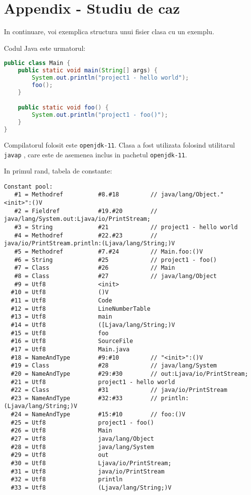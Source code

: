 \section{Appendix - Studiu de caz}\label{appendix:studiu_de_caz}

In continuare, voi exemplica structura unui fisier clasa cu un exemplu.

Codul Java este urmatorul:

\begin{lstlisting}[language=Java]
public class Main {
    public static void main(String[] args) {
        System.out.println("project1 - hello world");
        foo();
    }

    public static void foo() {
        System.out.println("project1 - foo()");
    }
}
\end{lstlisting}

Compilatorul folosit este \texttt{openjdk-11}. Clasa a fost utilizata
folosind utilitarul \texttt{javap} \cite{javap}, care este de asemenea inclus
in pachetul \texttt{openjdk-11}.

In primul rand, tabela de constante:

\begin{lstlisting}
Constant pool:
   #1 = Methodref          #8.#18         // java/lang/Object."<init>":()V
   #2 = Fieldref           #19.#20        // java/lang/System.out:Ljava/io/PrintStream;
   #3 = String             #21            // project1 - hello world
   #4 = Methodref          #22.#23        // java/io/PrintStream.println:(Ljava/lang/String;)V
   #5 = Methodref          #7.#24         // Main.foo:()V
   #6 = String             #25            // project1 - foo()
   #7 = Class              #26            // Main
   #8 = Class              #27            // java/lang/Object
   #9 = Utf8               <init>
  #10 = Utf8               ()V
  #11 = Utf8               Code
  #12 = Utf8               LineNumberTable
  #13 = Utf8               main
  #14 = Utf8               ([Ljava/lang/String;)V
  #15 = Utf8               foo
  #16 = Utf8               SourceFile
  #17 = Utf8               Main.java
  #18 = NameAndType        #9:#10         // "<init>":()V
  #19 = Class              #28            // java/lang/System
  #20 = NameAndType        #29:#30        // out:Ljava/io/PrintStream;
  #21 = Utf8               project1 - hello world
  #22 = Class              #31            // java/io/PrintStream
  #23 = NameAndType        #32:#33        // println:(Ljava/lang/String;)V
  #24 = NameAndType        #15:#10        // foo:()V
  #25 = Utf8               project1 - foo()
  #26 = Utf8               Main
  #27 = Utf8               java/lang/Object
  #28 = Utf8               java/lang/System
  #29 = Utf8               out
  #30 = Utf8               Ljava/io/PrintStream;
  #31 = Utf8               java/io/PrintStream
  #32 = Utf8               println
  #33 = Utf8               (Ljava/lang/String;)V
\end{lstlisting}

